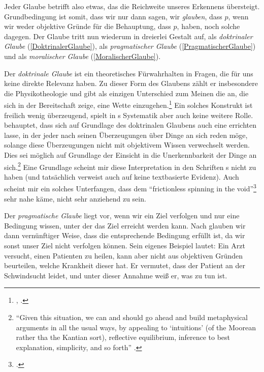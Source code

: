 Jeder Glaube betrifft also etwas, das die Reichweite unseres Erkennens
übersteigt. Grundbedingung ist somit, dass wir nur dann sagen, wir
\emph{glauben}, dass $p$, wenn wir weder objektive Gründe {für} die
Behauptung, dass $p$, haben, noch solche dagegen. Der Glaube tritt nun wiederum
in dreierlei Gestalt auf, als \emph{doktrinaler Glaube}
(\ref{DoktrinalerGlaube}), als \emph{pragmatischer Glaube}
(\ref{PragmatischerGlaube}) und als \emph{moralischer Glaube}
(\ref{MoralischerGlaube}).
%
\begin{nummerierung}
\item\label{DoktrinalerGlaube} Der \emph{doktrinale Glaube} ist ein
theoretisches Fürwahrhalten in Fragen, die für uns keine direkte Relevanz haben.
Zu dieser Form des Glaubens zählt er insbesondere die Physikotheologie und gibt
als einzigen Unterschied zum Meinen die  an, die sich in
der Bereitschaft zeige, eine Wette einzugehen.\footnote{\cite[Vgl.][B
852--856]{Kant:KritikderreinenVernunft2003},
\cite[][III: 534.14--536.11]{Kant:GesammelteWerke1900ff.}.} Ein solches
Konstrukt ist freilich wenig überzeugend, spielt in s
Systematik aber auch keine weitere
Rolle.  behauptet, dass sich
auf Grundlage des doktrinalen Glaubens auch eine  errichten lasse, in der jeder nach seinen Überzeugungen über Dinge
an sich reden möge, solange diese Überzeugungen nicht mit objektivem Wissen
verwechselt werden. Dies sei möglich auf Grundlage der Einsicht in die
Unerkennbarkeit der Dinge an sich.\footnote{\enquote{Given this situation, we can and
should go ahead and build metaphysical arguments in all the usual ways, by
appealing to \enquote{intuitions} (of the Moorean rather tha the Kantian sort),
reflective equilibrium, inference to best explanation, simplicity, and so forth}
\parencite[][360]{Chignell:BeliefinKant2007}.} Eine Grundlage scheint mir diese
Interpretation in den Schriften s nicht zu haben (und
tatsächlich verweist  auch auf keine
textbasierte Evidenz). Auch scheint mir ein solches Unterfangen, dass dem
\enquote{frictionless spinning in the
void}\footcite[][11]{McDowell:MindandWorld1994} sehr nahe käme, nicht sehr
anziehend zu sein.
%
\item\label{PragmatischerGlaube} Der \emph{pragmatische Glaube} liegt vor, wenn
wir ein Ziel verfolgen und nur eine Bedingung wissen, unter der das Ziel erreicht werden kann. Nach
 glauben wir dann vernünftiger Weise, dass die
entsprechende Bedingung erfüllt ist, da wir sonst unser Ziel nicht verfolgen
können. Sein eigenes Beispiel lautet: Ein Arzt versucht, einen Patienten zu
heilen, kann aber nicht aus objektiven Gründen beurteilen, welche Krankheit
dieser hat. Er vermutet, dass der Patient an der Schwindsucht leidet, und unter
dieser Annahme weiß er, was zu tun ist.


\end{nummerierung}

